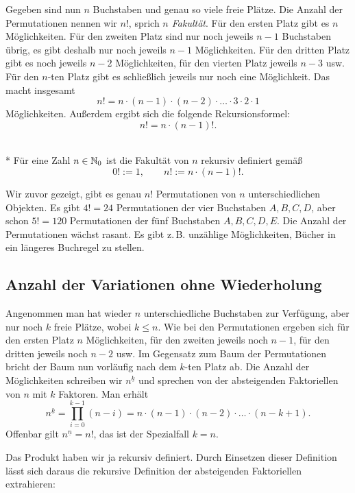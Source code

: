 \noindent
Gegeben sind nun $n$ Buchstaben und genau so viele freie Plätze.
Die Anzahl der Permutationen nennen wir $n!$, sprich \emph{$n$ Fakultät}.
Für den ersten Platz gibt es $n$ Möglichkeiten. Für den zweiten Platz
sind nur noch jeweils $n-1$ Buchstaben übrig, es gibt deshalb nur noch
jeweils $n-1$ Möglichkeiten. Für den dritten Platz gibt es noch jeweils
$n-2$ Möglichkeiten, für den vierten Platz jeweils $n-3$ usw. Für den
$n$-ten Platz gibt es schließlich jeweils nur noch eine Möglichkeit.
Das macht insgesamt%
\[n! = n\cdot (n-1)\cdot (n-2)\cdot\ldots\cdot 3\cdot 2\cdot 1\]
Möglichkeiten. Außerdem ergibt sich die folgende Rekursionsformel:%
\[n! = n\cdot (n-1)!.\]
\begin{Definition}[Fakultät]%
\label{def:fac}\mbox{}\\*
Für eine Zahl $n\in\mathbb N_0$ ist die Fakultät von $n$ rekursiv
definiert gemäß%
\[0! := 1,\qquad n! := n\cdot (n-1)!.\]
\end{Definition}
Wir zuvor gezeigt, gibt es genau $n!$ Permutationen von $n$
unterschiedlichen Objekten. Es gibt $4!=24$ Permutationen
der vier Buchstaben $A,B,C,D$, aber schon $5!=120$ Permutationen der
fünf Buchstaben $A,B,C,D,E$. Die Anzahl der Permutationen wächst
rasant. Es gibt z.\,B. unzählige Möglichkeiten, Bücher in ein
längeres Buchregel zu stellen.


\subsection{Anzahl der Variationen ohne Wiederholung}%

Angenommen man hat wieder $n$ unterschiedliche Buchstaben
zur Verfügung, aber nur noch $k$ freie Plätze, wobei $k\le n$.
Wie bei den Permutationen ergeben sich für den ersten Platz
$n$ Möglichkeiten, für den zweiten jeweils noch $n-1$,
für den dritten jeweils noch $n-2$ usw. Im Gegensatz zum
Baum der Permutationen bricht der Baum nun vorläufig
nach dem $k$-ten Platz ab. Die Anzahl der Möglichkeiten schreiben
wir $n^{\underline k}$ und sprechen von der absteigenden Faktoriellen
von $n$ mit $k$ Faktoren. Man erhält%
\[n^{\underline k} = \prod_{i=0}^{k-1} (n-i)
= n\cdot (n-1)\cdot (n-2)\cdot\ldots\cdot (n-k+1).\]
Offenbar gilt $n^{\underline n} = n!$, das ist der Spezialfall $k=n$.

Das Produkt haben wir ja rekursiv definiert. Durch Einsetzen dieser
Definition lässt sich daraus die rekursive Definition der absteigenden
Faktoriellen extrahieren:


